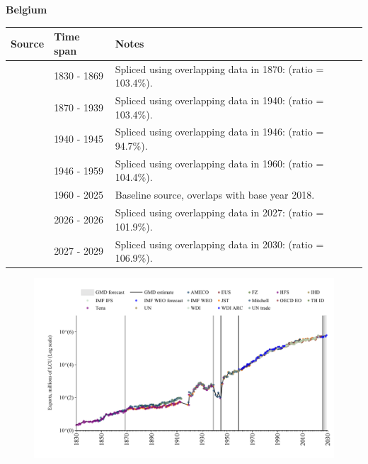 \documentclass[12pt,a4paper,landscape]{article}
\begin{document}
\begin{adjustbox}{max totalsize={\paperwidth}{\paperheight},center}
\begin{minipage}[t][\textheight][t]{\textwidth}
\vspace*{0.5cm}
{}
\begin{center}
{\Large\bfseries Belgium}
\end{center}
\vspace{0.5cm}
\begin{table}[H]
\centering
\small
\begin{tabular}{|l|l|l|}
\hline
\textbf{Source} & \textbf{Time span} & \textbf{Notes} \\
\hline
\rowcolor{white}\cite{Tena}& 1830 - 1869 &Spliced using overlapping data in 1870: (ratio = 103.4\%).\\
\rowcolor{lightgray}\cite{JST}& 1870 - 1939 &Spliced using overlapping data in 1940: (ratio = 103.4\%).\\
\rowcolor{white}\cite{Mitchell}& 1940 - 1945 &Spliced using overlapping data in 1946: (ratio = 94.7\%).\\
\rowcolor{lightgray}\cite{JST}& 1946 - 1959 &Spliced using overlapping data in 1960: (ratio = 104.4\%).\\
\rowcolor{white}\cite{OECD_EO}& 1960 - 2025 &Baseline source, overlaps with base year 2018.\\
\rowcolor{lightgray}\cite{AMECO}& 2026 - 2026 &Spliced using overlapping data in 2027: (ratio = 101.9\%).\\
\rowcolor{white}\cite{IMF_WEO_forecast}& 2027 - 2029 &Spliced using overlapping data in 2030: (ratio = 106.9\%).\\
\hline
\end{tabular}
\end{table}
\begin{figure}[H]
\centering
\includegraphics[width=\textwidth,height=0.6\textheight,keepaspectratio]{graphs/BEL_exports.pdf}
\end{figure}
\end{minipage}
\end{adjustbox}
\end{document}

